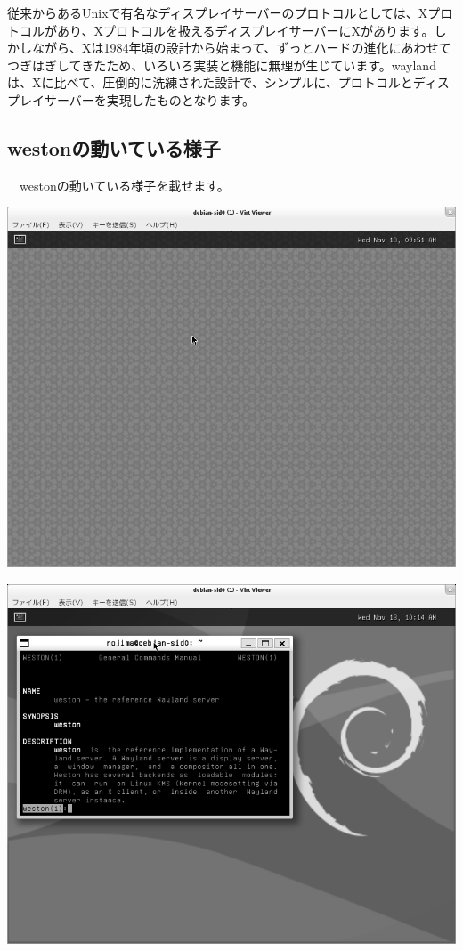 \documentclass[mingoth,a4paper]{jsarticle}
\begin{document}
 従来からあるUnixで有名なディスプレイサーバーのプロトコルとしては、Xプロトコルがあり、Xプロトコルを扱えるディスプレイサーバーにXがあります。しかしながら、Xは1984年頃の設計から始まって、ずっとハードの進化にあわせてつぎはぎしてきたため、いろいろ実装と機能に無理が生じています。waylandは、Xに比べて、圧倒的に洗練された設計で、シンプルに、プロトコルとディスプレイサーバーを実現したものとなります\cite{real-wayland-X}。


\subsection{westonの動いている様子}

　westonの動いている様子を載せます。

\begin{minipage}{0.5\hsize}
\includegraphics[width=0.8\hsize]{image201311/weston-1st-launch_mono.png}
\end{minipage}
\begin{minipage}{0.5\hsize}
\includegraphics[width=0.8\hsize]{image201311/weston-2nd-launch_mono.png}
\end{minipage}
\end{document}
